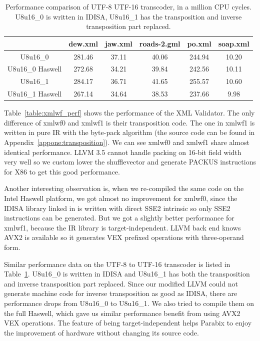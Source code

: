 \begin{table}[h]
\centering
\begin{tabular}{|c|c|c|c|c|c|}
\hline
 & dew.xml & jaw.xml & roads-2.gml & po.xml & soap.xml \\ \hline
 U8u16\_0         & 281.46  & 37.11   & 40.06       & 244.94 & 10.20    \\ \hline
 U8u16\_0 Haswell & 272.68  & 34.21   & 39.84       & 242.56 & 10.11    \\ \hline
 U8u16\_1         & 284.17  & 36.71   & 41.65       & 255.57 & 10.60     \\ \hline
 U8u16\_1 Haswell & 267.14  & 34.64   & 38.53       & 237.66 & 9.98     \\ \hline
 \end{tabular}
 \caption[Performance comparison of UTF-8 UTF-16 Transcoder]{Performance comparison of UTF-8 UTF-16 transcoder, in a million CPU cycles. U8u16\_0 is written in IDISA, U8u16\_1 has the transposition and inverse transposition part replaced.}
 \label{table:u8u16_perf}
 \end{table}

Table~\ref{table:xmlwf_perf} shows the performance of the XML Validator. The only difference of xmlwf0 and xmlwf1 is their transposition code. The one in xmlwf1 is written in pure IR with the byte-pack algorithm (the source code can be found in Appendix~\ref{appone:transposition}). We can see xmlwf0 and xmlwf1 share almost identical performance. LLVM 3.5 cannot handle packing on 16-bit field width very well so we custom lower the shufflevector and generate PACKUS instructions for X86 to get this good performance.

Another interesting observation is, when we re-compiled the same code on the Intel Haswell platform, we got almost no improvement for xmlwf0, since the IDISA library linked in is written with direct SSE2 intrinsic so only SSE2 instructions can be generated. But we got a slightly better performance for xmlwf1, because the IR library is target-independent. LLVM back end knows AVX2 is available so it generates VEX prefixed operations with three-operand form.

Similar performance data on the UTF-8 to UTF-16 transcoder is listed in Table~\ref{table:u8u16_perf}. U8u16\_0 is written in IDISA and U8u16\_1 has both the transposition and inverse transposition part replaced. Since our modified LLVM could not generate machine code for inverse transposition as good as IDISA, there are performance drops from U8u16\_0 to U8u16\_1. We also tried to compile them on the full Haswell, which gave us similar performance benefit from using AVX2 VEX operations. The feature of being target-independent helps Parabix to enjoy the improvement of hardware without changing its source code.

